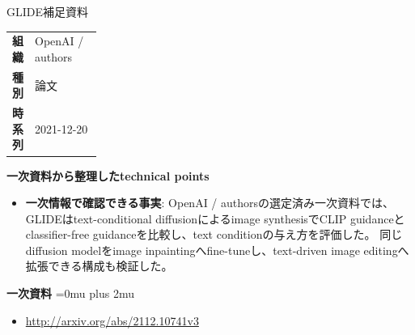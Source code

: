 \begin{technicalnote}{GLIDE}{補足資料}
\begingroup
\begin{tabularx}{\linewidth}{@{}>{\bfseries}p{0.22\linewidth}X@{}}
組織 & OpenAI / authors \\
種別 & 論文 \\
時系列 & 2021-12-20 \\
\end{tabularx}
\smallskip
\begin{minipage}{\linewidth}
{\bfseries 一次資料から整理したtechnical points}
\begin{itemize}[leftmargin=1.5em,itemsep=0.35em]
\item \textbf{一次情報で確認できる事実}: OpenAI / authorsの選定済み一次資料では、GLIDEはtext-conditional diffusionによるimage synthesisでCLIP guidanceとclassifier-free guidanceを比較し、text conditionの与え方を評価した。 同じdiffusion modelをimage inpaintingへfine-tuneし、text-driven image editingへ拡張できる構成も検証した。
\end{itemize}
\begin{minipage}{\linewidth}
\begin{samepage}
{\bfseries 一次資料}
\begingroup\sloppy
\Urlmuskip=0mu plus 2mu\relax
\begin{itemize}[leftmargin=1.5em,itemsep=0.25em]
\item {\scriptsize\url{http://arxiv.org/abs/2112.10741v3}}
\end{itemize}
\endgroup
\end{samepage}
\end{minipage}
\end{minipage}
\endgroup
\end{technicalnote}
\medskip

